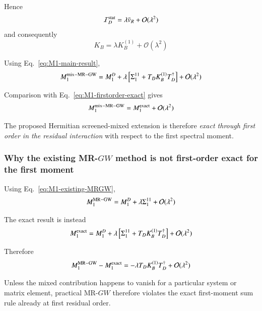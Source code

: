 \documentclass[aip,jcp,reprint,noshowkeys,superscriptaddress]{revtex4-1}
\begin{document}
Hence
\begin{equation}
  \mathcal I_D^{\rm stat}
  =
  \lambda\bar v_R
  +
  \mathcal O(\lambda^2)
\end{equation}
and consequently
\begin{equation}
  K_B
  =
  \lambda K_B^{(1)}
  +
  \mathcal O(\lambda^2)
  \label{eq:KB-firstorder}
\end{equation}

Using Eq.~\eqref{eq:M1-main-result},
\begin{equation}
  M_1^{\rm mix-MR-GW}
  =
  M_1^D
  +
  \lambda
  \left[
    \Sigma_1^{11}
    +
    T_DK_B^{(1)}T_D^\dagger
  \right]
  +
  \mathcal O(\lambda^2)
\end{equation}

Comparison with Eq.~\eqref{eq:M1-firstorder-exact} gives
\begin{equation}
  M_1^{\rm mix-MR-GW}
  =
  M_1^{\rm exact}
  +
  \mathcal O(\lambda^2)
  \label{eq:M1-firstorder-exact-method}
\end{equation}

The proposed Hermitian screened-mixed extension is therefore
\emph{exact through first order in the residual interaction} with
respect to the first spectral moment.


\subsubsection{Why the existing MR-$GW$ method is not first-order exact for
the first moment}

Using Eq.~\eqref{eq:M1-existing-MRGW},
\begin{equation}
  M_1^{\rm MR-GW}
  =
  M_1^D
  +
  \lambda\Sigma_1^{11}
  +
  \mathcal O(\lambda^2)
\end{equation}

The exact result is instead
\begin{equation}
  M_1^{\rm exact}
  =
  M_1^D
  +
  \lambda
  \left[
    \Sigma_1^{11}
    +
    T_DK_B^{(1)}T_D^\dagger
  \right]
  +
  \mathcal O(\lambda^2)
\end{equation}

Therefore
\begin{equation}
  M_1^{\rm MR-GW}
  -
  M_1^{\rm exact}
  =
  -
  \lambda
  T_DK_B^{(1)}T_D^\dagger
  +
  \mathcal O(\lambda^2)
  \label{eq:M1-MRGW-error}
\end{equation}

Unless the mixed contribution happens to vanish for a particular
system or matrix element, practical MR-$GW$ therefore violates the
exact first-moment sum rule already at first residual order.
\end{document}
